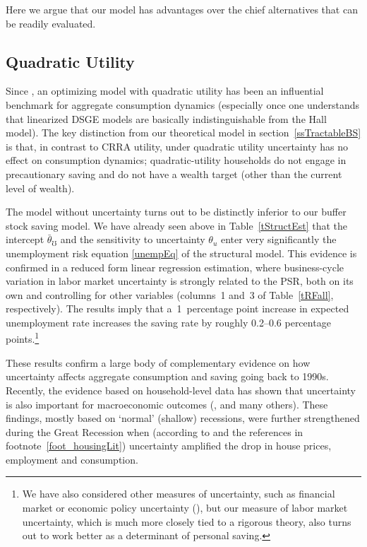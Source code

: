 \documentclass[titlepage]{\econtex}
\begin{document}
Here we argue that our model has advantages over the chief alternatives that can be readily evaluated.

\hypertarget{Quadratic-Utility}{}

\subsection{Quadratic Utility} \label{sec:Quadratic}

Since \cite{hallRandomWalk}, an optimizing model with quadratic utility has been an influential benchmark for aggregate consumption dynamics (especially once one understands that linearized DSGE models are basically indistinguishable from the Hall model). The key distinction from our theoretical model in section~\ref{ssTractableBS} is that, in contrast to CRRA utility, under quadratic utility uncertainty has no effect on consumption dynamics; quadratic-utility households do not engage in precautionary saving and do not have a wealth target (other than the current level of wealth).

The model without uncertainty turns out to be distinctly inferior to our buffer stock saving model.  We have already seen above in Table~\ref{tStructEst} that the intercept $\bar{\theta}_\mho$ and the sensitivity to uncertainty $\theta_u$ enter very significantly the  unemployment risk equation \eqref{unempEq} of the structural model.  This evidence is confirmed in a reduced form linear regression estimation, where business-cycle variation in labor market uncertainty is strongly related to the PSR, both on its own and controlling for other variables (columns~1 and~3 of Table~\ref{tRFall}, respectively). The results imply that a~1~percentage point increase in expected unemployment rate increases the saving rate by roughly 0.2--0.6 percentage points.\footnote{We have also considered other measures of uncertainty, such as financial market or economic policy uncertainty (\cite{bbdUncertainty}), but our measure of labor market uncertainty, which is much more closely tied to a rigorous theory, also turns out to work better as a determinant of personal saving.}

These results confirm a large body of complementary evidence on how uncertainty affects aggregate consumption and saving going back to 1990s. Recently, the evidence based on household-level data has shown that uncertainty is also important for macroeconomic outcomes (\cite{bfjstUncertain}, \cite{kv_microMacro} and many others). These findings, mostly based on `normal' (shallow) recessions,  were further strengthened during the Great Recession when (according to \cite{kmpHandbook} and the references in footnote~\ref{foot_housingLit}) uncertainty amplified the drop in house prices, employment and consumption.
\end{document}
